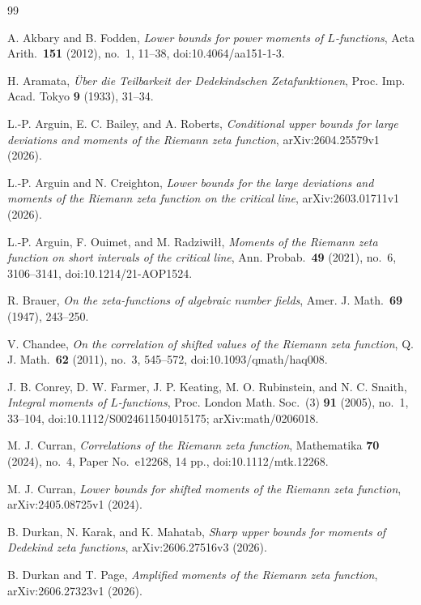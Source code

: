 \documentclass[11pt]{amsart}
\numberwithin{equation}{section}
\theoremstyle{plain}
\begin{document}
\begin{thebibliography}{99}

A. Akbary and B. Fodden,
\emph{Lower bounds for power moments of $L$-functions},
Acta Arith.\ \textbf{151} (2012), no.~1, 11--38,
doi:10.4064/aa151-1-3.

H. Aramata,
\emph{{\"U}ber die Teilbarkeit der Dedekindschen Zetafunktionen},
Proc. Imp. Acad. Tokyo \textbf{9} (1933), 31--34.

L.-P. Arguin, E. C. Bailey, and A. Roberts,
\emph{Conditional upper bounds for large deviations and moments of the
Riemann zeta function},
arXiv:2604.25579v1 (2026).

L.-P. Arguin and N. Creighton,
\emph{Lower bounds for the large deviations and moments of the Riemann zeta
function on the critical line},
arXiv:2603.01711v1 (2026).

L.-P. Arguin, F. Ouimet, and M. Radziwi\l\l{},
\emph{Moments of the Riemann zeta function on short intervals of the
critical line},
Ann. Probab.\ \textbf{49} (2021), no.~6, 3106--3141,
doi:10.1214/21-AOP1524.

R. Brauer,
\emph{On the zeta-functions of algebraic number fields},
Amer. J. Math.\ \textbf{69} (1947), 243--250.

V. Chandee,
\emph{On the correlation of shifted values of the Riemann zeta function},
Q. J. Math.\ \textbf{62} (2011), no.~3, 545--572,
doi:10.1093/qmath/haq008.

J. B. Conrey, D. W. Farmer, J. P. Keating, M. O. Rubinstein, and
N. C. Snaith,
\emph{Integral moments of $L$-functions},
Proc. London Math. Soc.\ (3) \textbf{91} (2005), no.~1, 33--104,
doi:10.1112/S0024611504015175; arXiv:math/0206018.

M. J. Curran,
\emph{Correlations of the Riemann zeta function},
Mathematika \textbf{70} (2024), no.~4, Paper No.~e12268, 14 pp.,
doi:10.1112/mtk.12268.

M. J. Curran,
\emph{Lower bounds for shifted moments of the Riemann zeta function},
arXiv:2405.08725v1 (2024).

B. Durkan, N. Karak, and K. Mahatab,
\emph{Sharp upper bounds for moments of Dedekind zeta functions},
arXiv:2606.27516v3 (2026).

B. Durkan and T. Page,
\emph{Amplified moments of the Riemann zeta function},
arXiv:2606.27323v1 (2026).


\end{thebibliography}
\end{document}
